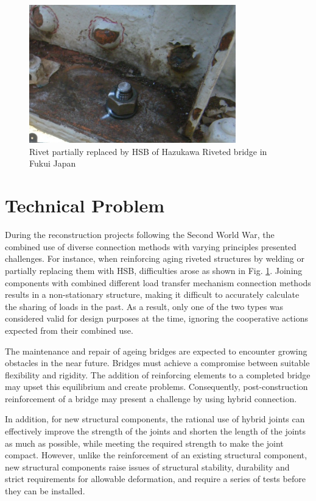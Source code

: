 \begin{figure}
    \centering
    \includegraphics[width=0.8\textwidth]{imgs/intro/HSB-rivet.JPG}
    \caption{Rivet partially replaced by HSB of Hazukawa Riveted bridge in Fukui Japan}
    \label{fig-tprivet}
\end{figure}


\section{Technical Problem}

During the reconstruction projects following the Second World War, the combined use of diverse connection methods with varying principles presented challenges. For instance, when reinforcing aging riveted structures by welding or partially replacing them with \ac{HSB}, difficulties arose as shown in Fig. \ref{fig-tprivet}. Joining components with combined different load transfer mechanism connection methods results in a non-stationary structure, making it difficult to accurately calculate the sharing of loads in the past. As a result, only one of the two types was considered valid for design purposes at the time, ignoring the cooperative actions expected from their combined use.

The maintenance and repair of ageing bridges are expected to encounter growing obstacles in the near future. Bridges must achieve a compromise between suitable flexibility and rigidity. The addition of reinforcing elements to a completed bridge may upset this equilibrium and create problems. Consequently, post-construction reinforcement of a bridge may present a challenge by using hybrid connection.

In addition, for new structural components, the rational use of hybrid joints can effectively improve the strength of the joints and shorten the length of the joints as much as possible, while meeting the required strength to make the joint compact.  However, unlike the reinforcement of an existing structural component, new structural components raise issues of structural stability, durability and strict requirements for allowable deformation, and require a series of tests before they can be installed.

